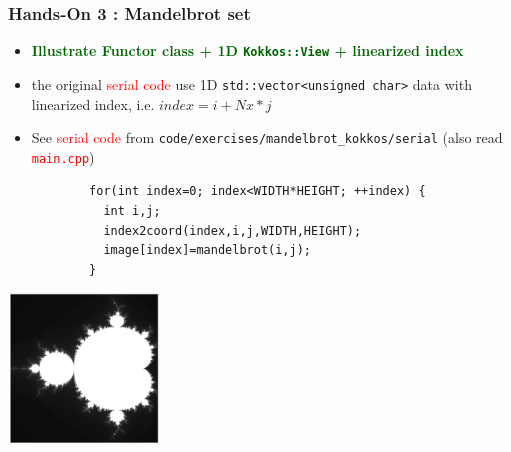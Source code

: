\begin{frame}[fragile=singleslide]
  \frametitle{Hands-On 3 : Mandelbrot set}

  \begin{itemize}
  \item \textcolor{darkgreen}{\textbf{Illustrate Functor class + 1D \texttt{Kokkos::View} + linearized index}}
  \item the original \textcolor{red}{serial code} use 1D \texttt{std::vector<unsigned char>} data with linearized index, i.e. $index = i + Nx * j$
  \item See \textcolor{red}{serial code} from \texttt{code/exercises/mandelbrot\_kokkos/serial} (also read \textcolor{red}{\texttt{main.cpp}})
    {\small
      \begin{verbatim}
        for(int index=0; index<WIDTH*HEIGHT; ++index) {
          int i,j;
          index2coord(index,i,j,WIDTH,HEIGHT);
          image[index]=mandelbrot(i,j);
        }
      \end{verbatim}
    }
  \end{itemize}

  \begin{center}
    \includegraphics[width=4cm]{images/mandelbrot}
  \end{center}
  
\end{frame}

